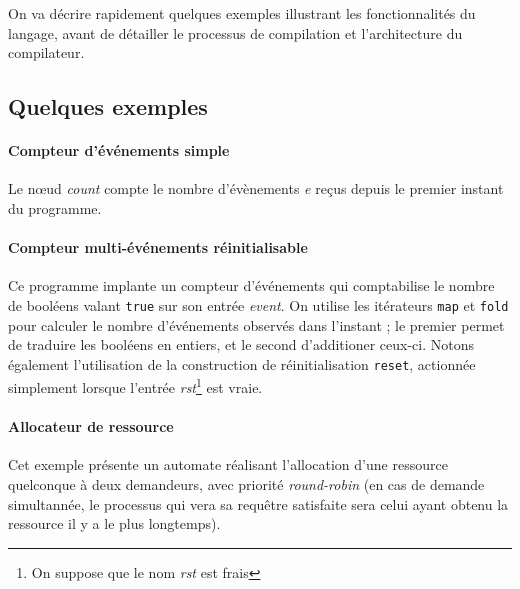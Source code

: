 \documentclass[a4paper]{article}
\begin{document}
On va d\'ecrire rapidement quelques exemples illustrant les fonctionnalit\'es du
langage, avant de d\'etailler le processus de compilation et l'architecture du
compilateur.

\subsection{Quelques exemples}

\paragraph{Compteur d'\'ev\'enements simple}



Le nœud \textit{count} compte le nombre d'\'ev\`enements \textit{e} re\c{c}us depuis le
premier instant du programme.

\paragraph{Compteur multi-\'ev\'enements r\'einitialisable}

\begin{center}
  
\end{center}

Ce programme implante un compteur d'\'ev\'enements qui comptabilise le nombre de
bool\'eens valant \texttt{true} sur son entr\'ee \textit{event}. On utilise les
it\'erateurs \texttt{map} et \texttt{fold} pour calculer le nombre d'\'ev\'enements
observ\'es dans l'instant ; le premier permet de traduire les bool\'eens en entiers,
et le second d'additioner ceux-ci. Notons \'egalement l'utilisation de la
construction de r\'einitialisation \texttt{reset}, actionn\'ee simplement lorsque
l'entr\'ee \textit{rst}\footnote{On suppose que le nom \textit{rst} est frais} est
vraie.

\paragraph{Allocateur de ressource}



Cet exemple pr\'esente un automate r\'ealisant l'allocation d'une ressource
quelconque \`a deux demandeurs, avec priorit\'e \textit{round-robin} (en cas de
demande simultann\'ee, le processus qui vera sa requ\^etre satisfaite sera celui
ayant obtenu la ressource il y a le plus longtemps).
\end{document}
